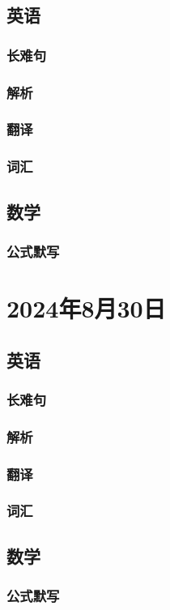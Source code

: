 \documentclass[UTF8]{ctexart}
\begin{document}
\subsection{英语}
\subsubsection{长难句}
\subsubsection{解析}
\subsubsection{翻译}
\subsubsection{词汇}
\subsection{数学}
\subsubsection{公式默写}
\begin{multicols}{2}
\end{multicols}
\section{2024年8月30日}
\subsection{英语}
\subsubsection{长难句}
\subsubsection{解析}
\subsubsection{翻译}
\subsubsection{词汇}
\subsection{数学}
\subsubsection{公式默写}
\begin{multicols}{2}
\end{multicols}
\end{document}
